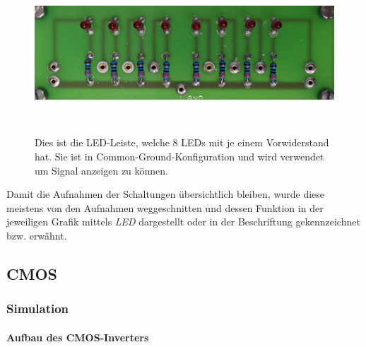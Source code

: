 \documentclass[12pt,english,ngerman]{scrartcl}
\begin{document}
\begin{figure}[H]
  \centering
  \includegraphics[width=\textwidth, height=6cm,keepaspectratio]{./figures/messungen/ledleiste.jpg}
  \caption{Dies ist die LED-Leiste, welche 8 LEDs mit je einem Vorwiderstand
  hat. Sie ist in Common-Ground-Konfiguration und wird verwendet um Signal
  anzeigen zu können.}
  \label{fig:aufbau_led}
\end{figure}

Damit die Aufnahmen der Schaltungen übersichtlich bleiben, wurde diese meistens
von den Aufnahmen weggeschnitten und dessen Funktion in der jeweiligen Grafik mittels \textit{LED} 
dargestellt oder in der Beschriftung gekennzeichnet bzw. erwähnt.

\subsection{CMOS}
\subsubsection{Simulation}
\paragraph{Aufbau des CMOS-Inverters}
\end{document}
